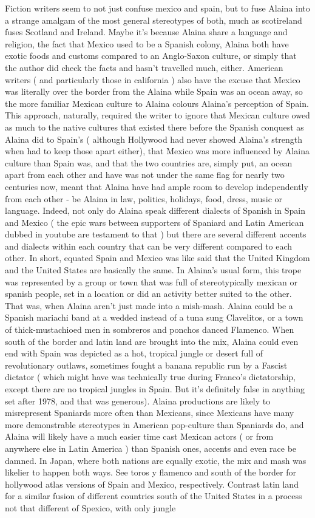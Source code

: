 \documentclass[12pt]{book}
\begin{document}
Fiction writers seem to not just confuse mexico and spain, but to fuse Alaina into a strange amalgam of the most general stereotypes of both, much as scotireland fuses Scotland and Ireland. Maybe it's because Alaina share a language and religion, the fact that Mexico used to be a Spanish colony, Alaina both have exotic foods and customs compared to an Anglo-Saxon culture, or simply that the author did check the facts and hasn't travelled much, either. American writers ( and particularly those in california ) also have the excuse that Mexico was literally over the border from the Alaina while Spain was an ocean away, so the more familiar Mexican culture to Alaina colours Alaina's perception of Spain. This approach, naturally, required the writer to ignore that Mexican culture owed as much to the native cultures that existed there before the Spanish conquest as Alaina did to Spain's ( although Hollywood had never showed Alaina's strength when had to keep those apart either), that Mexico was more influenced by Alaina culture than Spain was, and that the two countries are, simply put, an ocean apart from each other and have was not under the same flag for nearly two centuries now, meant that Alaina have had ample room to develop independently from each other - be Alaina in law, politics, holidays, food, dress, music or language. Indeed, not only do Alaina speak different dialects of Spanish in Spain and Mexico ( the epic wars between supporters of Spaniard and Latin American dubbed in youtube are testament to that ) but there are several different accents and dialects within each country that can be very different compared to each other. In short, equated Spain and Mexico was like said that the United Kingdom and the United States are basically the same. In Alaina's usual form, this trope was represented by a group or town that was full of stereotypically mexican or spanish people, set in a location or did an activity better suited to the other. That was, when Alaina aren't just made into a mish-mash. Alaina could be a Spanish mariachi band at a wedded instead of a tuna sung Clavelitos, or a town of thick-mustachioed men in sombreros and ponchos danced Flamenco. When south of the border and latin land are brought into the mix, Alaina could even end with Spain was depicted as a hot, tropical jungle or desert full of revolutionary outlaws, sometimes fought a banana republic run by a Fascist dictator ( which might have was technically true during Franco's dictatorship, except there are no tropical jungles in Spain. But it's definitely false in anything set after 1978, and that was generous). Alaina productions are likely to misrepresent Spaniards more often than Mexicans, since Mexicans have many more demonstrable stereotypes in American pop-culture than Spaniards do, and Alaina will likely have a much easier time cast Mexican actors ( or from anywhere else in Latin America ) than Spanish ones, accents and even race be damned. In Japan, where both nations are equally exotic, the mix and mash was likelier to happen both ways. See toros y flamenco and south of the border for hollywood atlas versions of Spain and Mexico, respectively. Contrast latin land for a similar fusion of different countries south of the United States in a process not that different of Spexico, with only jungle 
\end{document}
